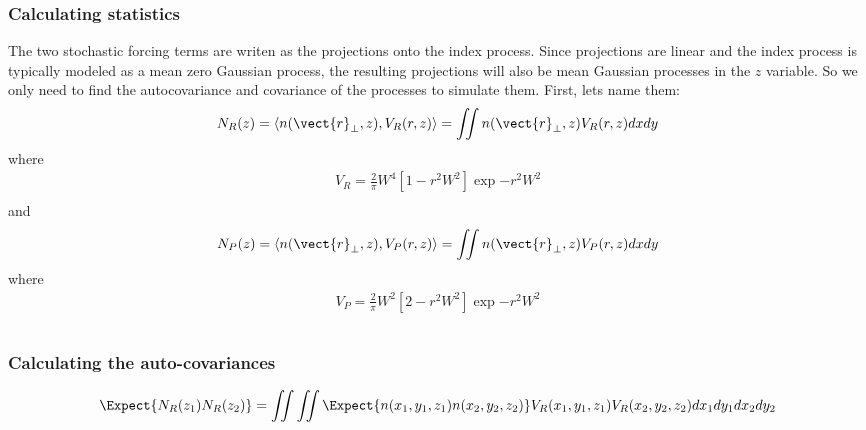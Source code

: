 \subsubsection{Calculating statistics}
The two stochastic forcing terms are writen as the projections onto the index process. Since projections are linear and the index process is typically modeled as a mean zero Gaussian process, the resulting projections will also be mean Gaussian processes in the $z$ variable.  So we only need to find the autocovariance and covariance of the processes to simulate them.  First, lets name them:
\begin{equation}
\begin{split}
      N_{R}(z)  = \left< n(\vect{r}_{\perp},z),V_{R}(r,z)\right> = \iint n(\vect{r}_{\perp},z)V_{R}(r,z)dx dy\\
\end{split}
\end{equation}
where 
\begin{equation}
\begin{split}
      V_{R} = \frac{2}{\pi} W^4 \left[1  -  r^2 W^2\right]\exp{-r^2 W^2}\\
\end{split}
\end{equation}
and
\begin{equation}
\begin{split}
      N_{P}(z)  = \left< n(\vect{r}_{\perp},z),V_{P}(r,z)\right> =  \iint n(\vect{r}_{\perp},z)V_{P}(r,z) dx dy\\
\end{split}
\end{equation}
where 
\begin{equation}
\begin{split}
      V_{P} = \frac{2}{\pi} W^2 \left[ 2 - r^2 W^2\right] \exp{-r^2 W^2}\\ \\
\end{split}
\end{equation}


\subsubsection{Calculating the auto-covariances}
\begin{equation}
\begin{split}
      \Expect{N_{R}(z_1)N_{R}(z_2)}  =  \iint \iint \Expect{n(x_1,y_1,z_1)n(x_2,y_2,z_2)} V_{R}(x_1,y_1,z_1)V_{R}(x_2,y_2,z_2) dx_1 dy_1 dx_2 dy_2\\
\end{split}
\end{equation}



